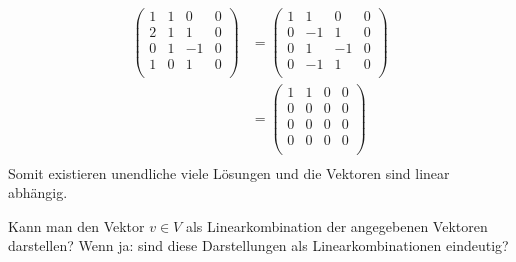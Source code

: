 \documentclass{article}
\begin{document}
\begin{enumerate}[(i)]
  \begin{align*}
    \left(
    \begin{array}{ccc|c}
      1 & 1 & 0  & 0 \\
      2 & 1 & 1  & 0 \\
      0 & 1 & -1 & 0 \\
      1 & 0 & 1  & 0 \\
    \end{array}
    \right)
    &=
    \left(
    \begin{array}{ccc|c}
      1 & 1  & 0  & 0 \\
      0 & -1 & 1  & 0 \\
      0 & 1  & -1 & 0 \\
      0 & -1 & 1  & 0 \\
    \end{array}
    \right) \\
    &=
    \left(
    \begin{array}{ccc|c}
      1 & 1 & 0 & 0 \\
      0 & 0 & 0 & 0 \\
      0 & 0 & 0 & 0 \\
      0 & 0 & 0 & 0 \\
    \end{array}
    \right) \\
  \end{align*}
  Somit existieren unendliche viele Lösungen und die Vektoren sind linear abhängig.
\end{enumerate}

Kann man den Vektor $v \in V$ als Linearkombination der angegebenen Vektoren darstellen? Wenn ja:
sind diese Darstellungen als Linearkombinationen eindeutig?
\end{document}
